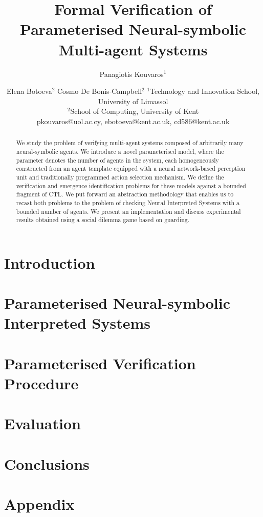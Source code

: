 \documentclass{article}
\title{Formal Verification of  Parameterised Neural-symbolic Multi-agent Systems}
\author{
Panagiotis Kouvaros$^1$
\and
Elena Botoeva$^2$\And
Cosmo De Bonis-Campbell$^{2}$
\affiliations
$^1$Technology and Innovation School, University of Limassol\\
$^2$School of Computing, University of Kent\\
\emails
pkouvaros@uol.ac.cy,
ebotoeva@kent.ac.uk,
cd586@kent.ac.uk
}
\begin{document}
\maketitle

\begin{abstract}

We study the problem of verifying multi-agent systems composed of arbitrarily
many neural-symbolic agents. We introduce a novel parameterised model, where the
parameter denotes the number of agents in the system, each homogeneously
constructed from an agent template equipped with a neural network-based
perception unit  and traditionally programmed action selection mechanism. We
define the verification and emergence identification problems for these models
against a bounded fragment of CTL. We put forward an abstraction methodology
that enables us to recast both problems to the problem of checking Neural
Interpreted Systems with a bounded number of agents. We present an
implementation and discuss experimental results obtained using a social dilemma
game based on guarding.

\end{abstract}

\section{Introduction}
\label{sec:intro}


\section{Parameterised Neural-symbolic Interpreted Systems}
\label{sec:pnis}


\section{Parameterised Verification Procedure}
\label{sec:verification}


\section{Evaluation}
\label{sec:eval}


\section{Conclusions}
\label{sec:conclusions}







\section*{Appendix}

\end{document}
